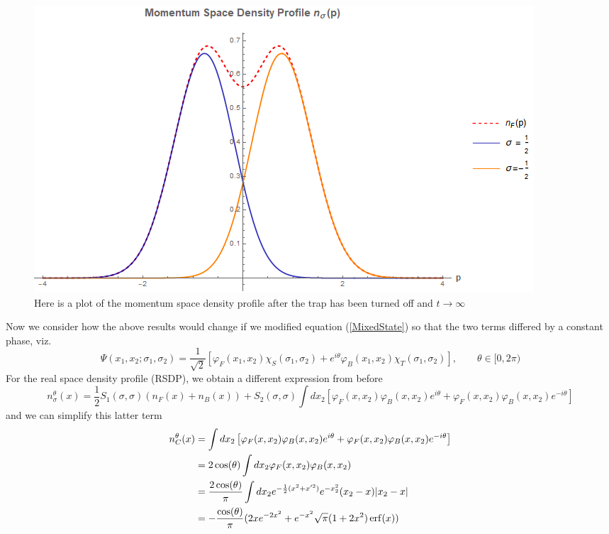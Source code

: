 \documentclass[onecolumn,english,aps,pra]{revtex4}
\begin{document}
\begin{figure}[h]
\includegraphics[scale=0.6]{"../Plots/MomentumSpaceDProfileMixedSpinorDF"}
\caption{Here is a plot of the momentum space density profile after the trap has been turned off and $t \rightarrow \infty$}
\label{fig:nsRSDP-DF}
\end{figure}

Now we consider how the above results would change if we modified equation (\ref{MixedState}) so that the two terms differed by a constant phase, viz.
\begin{equation}
\Psi(x_1, x_2; \sigma_1, \sigma_2) = \frac{1}{\sqrt{2}}\left[\varphi_F(x_1, x_2) \chi_S(\sigma_1, \sigma_2) + e^{i\theta	}\varphi_B(x_1,x_2) \chi_T(\sigma_1, \sigma_2)\right], \qquad \theta \in [0,2\pi)
\end{equation}
%
For the real space density profile (RSDP), we obtain a different expression from before
\[
n_{\sigma}^\theta(x) = \frac{1}{2}S_1(\sigma, \sigma)(n_F(x) + n_B(x)) +   S_2(\sigma,\sigma) \int dx_2 
\left[ \varphi_F(x,x_2)\varphi_B(x,x_2) e^{i\theta} + \varphi_F(x,x_2)\varphi_B(x,x_2) e^{-i\theta} \right]
\]
and we can simplify this latter term
\begin{align*}
n_C^\theta(x) & =  \int dx_2 
\left[ \varphi_F(x,x_2)\varphi_B(x,x_2) e^{i\theta} + \varphi_F(x,x_2)\varphi_B(x,x_2) e^{-i\theta} \right]\\
& = 2 \cos (\theta) \int dx_2 \varphi_F(x,x_2)\varphi_B(x,x_2)\\
& = \frac{2 \cos (\theta)}{\pi} \int dx_2 e^{-\frac{1}{2}(x^2 + x'^2)} e^{-x_2^2} (x_2 -x) |x_2 - x|\\
& = -\frac{\cos (\theta)}{\pi} (2xe^{-2x^2} + e^{-x^2}\sqrt{\pi} (1 + 2 x^2) \erf(x))
\end{align*}
\end{document}
